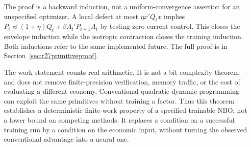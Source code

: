 The proof is a backward induction, not a uniform-convergence assertion for an
unspecified optimizer. A local defect at most $\eta x'Q_tx$ implies
$P_t\preceq(1+\eta)Q_t+\beta A_t'P_{t+1}A_t$ by testing zero current control.
This closes the envelope induction while the isotropic contraction closes the
training induction. Both inductions refer to the same implemented future.
The full proof is in Section~\ref{sec:r27primitiveproof}.

The work statement counts real arithmetic. It is not a bit-complexity theorem
and does not remove finite-precision verification, memory traffic, or the cost
of evaluating a different economy. Conventional quadratic dynamic programming
can exploit the same primitives without training a factor. Thus this theorem
establishes a deterministic finite-work property of a specified trainable NBO,
not a lower bound on competing methods. It replaces a condition on a successful
training run by a condition on the economic input, without turning the
observed conventional advantage into a neural one.
